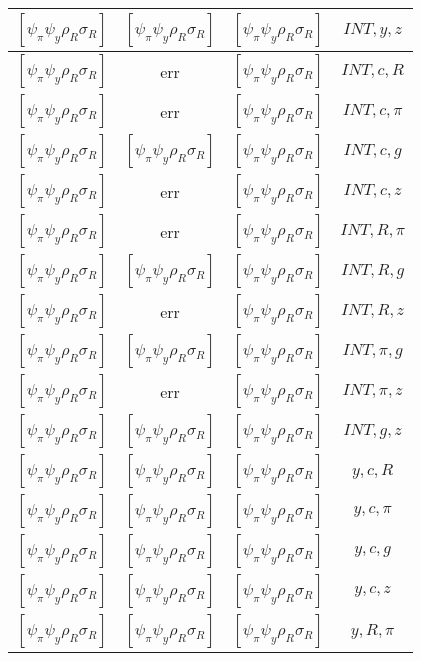 \documentclass[a4paper,10pt]{article}
\begin{document}
\begin{longtable}{|c|c|c|c|}
\hline
$[\psi_\pi \psi_y \rho_R \sigma_R ]$ & $[\psi_\pi \psi_y \rho_R \sigma_R ]$ & $[\psi_\pi \psi_y \rho_R \sigma_R ]$ & ${INT},{y},{z}$ \\
\hline
$[\psi_\pi \psi_y \rho_R \sigma_R ]$ & err & $[\psi_\pi \psi_y \rho_R \sigma_R ]$ & ${INT},{c},{R}$ \\
\hline
$[\psi_\pi \psi_y \rho_R \sigma_R ]$ & err & $[\psi_\pi \psi_y \rho_R \sigma_R ]$ & ${INT},{c},{\pi}$ \\
\hline
$[\psi_\pi \psi_y \rho_R \sigma_R ]$ & $[\psi_\pi \psi_y \rho_R \sigma_R ]$ & $[\psi_\pi \psi_y \rho_R \sigma_R ]$ & ${INT},{c},{g}$ \\
\hline
$[\psi_\pi \psi_y \rho_R \sigma_R ]$ & err & $[\psi_\pi \psi_y \rho_R \sigma_R ]$ & ${INT},{c},{z}$ \\
\hline
$[\psi_\pi \psi_y \rho_R \sigma_R ]$ & err & $[\psi_\pi \psi_y \rho_R \sigma_R ]$ & ${INT},{R},{\pi}$ \\
\hline
$[\psi_\pi \psi_y \rho_R \sigma_R ]$ & $[\psi_\pi \psi_y \rho_R \sigma_R ]$ & $[\psi_\pi \psi_y \rho_R \sigma_R ]$ & ${INT},{R},{g}$ \\
\hline
$[\psi_\pi \psi_y \rho_R \sigma_R ]$ & err & $[\psi_\pi \psi_y \rho_R \sigma_R ]$ & ${INT},{R},{z}$ \\
\hline
$[\psi_\pi \psi_y \rho_R \sigma_R ]$ & $[\psi_\pi \psi_y \rho_R \sigma_R ]$ & $[\psi_\pi \psi_y \rho_R \sigma_R ]$ & ${INT},{\pi},{g}$ \\
\hline
$[\psi_\pi \psi_y \rho_R \sigma_R ]$ & err & $[\psi_\pi \psi_y \rho_R \sigma_R ]$ & ${INT},{\pi},{z}$ \\
\hline
$[\psi_\pi \psi_y \rho_R \sigma_R ]$ & $[\psi_\pi \psi_y \rho_R \sigma_R ]$ & $[\psi_\pi \psi_y \rho_R \sigma_R ]$ & ${INT},{g},{z}$ \\
\hline
$[\psi_\pi \psi_y \rho_R \sigma_R ]$ & $[\psi_\pi \psi_y \rho_R \sigma_R ]$ & $[\psi_\pi \psi_y \rho_R \sigma_R ]$ & ${y},{c},{R}$ \\
\hline
$[\psi_\pi \psi_y \rho_R \sigma_R ]$ & $[\psi_\pi \psi_y \rho_R \sigma_R ]$ & $[\psi_\pi \psi_y \rho_R \sigma_R ]$ & ${y},{c},{\pi}$ \\
\hline
$[\psi_\pi \psi_y \rho_R \sigma_R ]$ & $[\psi_\pi \psi_y \rho_R \sigma_R ]$ & $[\psi_\pi \psi_y \rho_R \sigma_R ]$ & ${y},{c},{g}$ \\
\hline
$[\psi_\pi \psi_y \rho_R \sigma_R ]$ & $[\psi_\pi \psi_y \rho_R \sigma_R ]$ & $[\psi_\pi \psi_y \rho_R \sigma_R ]$ & ${y},{c},{z}$ \\
\hline
$[\psi_\pi \psi_y \rho_R \sigma_R ]$ & $[\psi_\pi \psi_y \rho_R \sigma_R ]$ & $[\psi_\pi \psi_y \rho_R \sigma_R ]$ & ${y},{R},{\pi}$ \\

\end{longtable}
\end{document}

